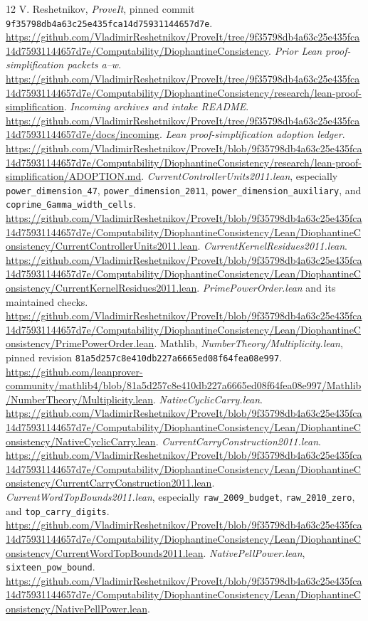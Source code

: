 \documentclass[11pt]{article}
\newcommand{\code}[1]{\nolinkurl{#1}}
\begin{document}
\clearpage
\begin{thebibliography}{12}
 V. Reshetnikov, \emph{ProveIt}, pinned commit
\code{9f35798db4a63c25e435fca14d75931144657d7e}.
\url{https://github.com/VladimirReshetnikov/ProveIt/tree/9f35798db4a63c25e435fca14d75931144657d7e/Computability/DiophantineConsistency}.
 \emph{Prior Lean proof-simplification packets a--w}.
\url{https://github.com/VladimirReshetnikov/ProveIt/tree/9f35798db4a63c25e435fca14d75931144657d7e/Computability/DiophantineConsistency/research/lean-proof-simplification}.
 \emph{Incoming archives and intake README}.
\url{https://github.com/VladimirReshetnikov/ProveIt/tree/9f35798db4a63c25e435fca14d75931144657d7e/docs/incoming}.
 \emph{Lean proof-simplification adoption ledger}.
\url{https://github.com/VladimirReshetnikov/ProveIt/blob/9f35798db4a63c25e435fca14d75931144657d7e/Computability/DiophantineConsistency/research/lean-proof-simplification/ADOPTION.md}.
 \emph{CurrentControllerUnits2011.lean}, especially
\code{power_dimension_47}, \code{power_dimension_2011},
\code{power_dimension_auxiliary}, and \code{coprime_Gamma_width_cells}.
\url{https://github.com/VladimirReshetnikov/ProveIt/blob/9f35798db4a63c25e435fca14d75931144657d7e/Computability/DiophantineConsistency/Lean/DiophantineConsistency/CurrentControllerUnits2011.lean}.
 \emph{CurrentKernelResidues2011.lean}.
\url{https://github.com/VladimirReshetnikov/ProveIt/blob/9f35798db4a63c25e435fca14d75931144657d7e/Computability/DiophantineConsistency/Lean/DiophantineConsistency/CurrentKernelResidues2011.lean}.
 \emph{PrimePowerOrder.lean} and its maintained checks.
\url{https://github.com/VladimirReshetnikov/ProveIt/blob/9f35798db4a63c25e435fca14d75931144657d7e/Computability/DiophantineConsistency/Lean/DiophantineConsistency/PrimePowerOrder.lean}.
 Mathlib, \emph{NumberTheory/Multiplicity.lean}, pinned revision
\code{81a5d257c8e410db227a6665ed08f64fea08e997}.
\url{https://github.com/leanprover-community/mathlib4/blob/81a5d257c8e410db227a6665ed08f64fea08e997/Mathlib/NumberTheory/Multiplicity.lean}.
 \emph{NativeCyclicCarry.lean}.
\url{https://github.com/VladimirReshetnikov/ProveIt/blob/9f35798db4a63c25e435fca14d75931144657d7e/Computability/DiophantineConsistency/Lean/DiophantineConsistency/NativeCyclicCarry.lean}.
 \emph{CurrentCarryConstruction2011.lean}.
\url{https://github.com/VladimirReshetnikov/ProveIt/blob/9f35798db4a63c25e435fca14d75931144657d7e/Computability/DiophantineConsistency/Lean/DiophantineConsistency/CurrentCarryConstruction2011.lean}.
 \emph{CurrentWordTopBounds2011.lean}, especially
\code{raw_2009_budget}, \code{raw_2010_zero}, and \code{top_carry_digits}.
\url{https://github.com/VladimirReshetnikov/ProveIt/blob/9f35798db4a63c25e435fca14d75931144657d7e/Computability/DiophantineConsistency/Lean/DiophantineConsistency/CurrentWordTopBounds2011.lean}.
 \emph{NativePellPower.lean}, \code{sixteen_pow_bound}.
\url{https://github.com/VladimirReshetnikov/ProveIt/blob/9f35798db4a63c25e435fca14d75931144657d7e/Computability/DiophantineConsistency/Lean/DiophantineConsistency/NativePellPower.lean}.
\end{thebibliography}
\end{document}
